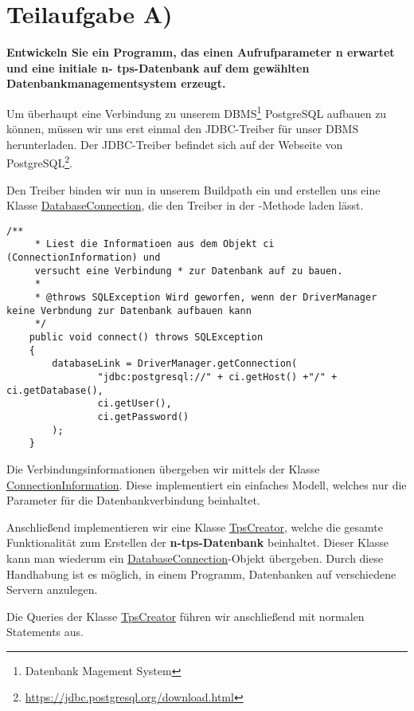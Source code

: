 \section{Teilaufgabe A)}
\textbf{Entwickeln Sie ein Programm, das einen Aufrufparameter n erwartet und eine initiale n-
tps-Datenbank auf dem gewählten Datenbankmanagementsystem erzeugt.}

Um überhaupt eine Verbindung zu unserem DBMS\footnote{Datenbank Magement
System} PostgreSQL aufbauen zu können, müssen wir uns erst einmal den
JDBC-Treiber für unser DBMS herunterladen. Der JDBC-Treiber befindet sich auf der
Webseite von PostgreSQL\footnote{\url{https://jdbc.postgresql.org/download.html}}.

Den Treiber binden wir nun in unserem Buildpath ein und erstellen
uns eine Klasse \hyperref[lst:dbv2]{DatabaseConnection}, die den Treiber in der
-Methode laden lässt.

\begin{lstlisting}[caption={connect Funktion}]
	/**
	 * Liest die Informatioen aus dem Objekt ci (ConnectionInformation) und
	 versucht eine Verbindung * zur Datenbank auf zu bauen.
	 * 
	 * @throws SQLException Wird geworfen, wenn der DriverManager keine Verbndung zur Datenbank aufbauen kann
	 */
	public void connect() throws SQLException
	{
		databaseLink = DriverManager.getConnection(
				"jdbc:postgresql://" + ci.getHost() +"/" + ci.getDatabase(),
				ci.getUser(), 
				ci.getPassword()
		);
	}
\end{lstlisting}

Die Verbindungsinformationen übergeben wir mittels der Klasse
\hyperref[lst:civ2]{ConnectionInformation}. Diese implementiert ein einfaches
Modell, welches nur die Parameter für die Datenbankverbindung beinhaltet.

Anschließend implementieren wir eine Klasse \hyperref[lst:tpsv2]{TpsCreator},
welche die gesamte Funktionalität zum Erstellen der \textbf{n-tps-Datenbank} beinhaltet.
Dieser Klasse kann man wiederum ein
\hyperref[lst:dbv2]{DatabaseConnection}-Objekt übergeben. Durch diese Handhabung
ist es möglich, in einem Programm, Datenbanken auf verschiedene Servern anzulegen.

Die Queries der Klasse \hyperref[lst:tpsv2]{TpsCreator}
führen wir anschließend mit normalen Statements aus. 

